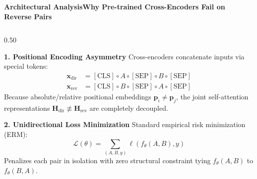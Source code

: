 \documentclass[aspectratio=169,10pt]{beamer}
\begin{document}
\begin{frame}{\textbf{Architectural Analysis}}{\textbf{Why Pre-trained Cross-Encoders Fail on Reverse Pairs}}
  \begin{columns}[T]
    \begin{column}{0.50\textwidth}
      \begin{block}{\textbf{1. Positional Encoding Asymmetry}}
        \footnotesize
        Cross-encoders concatenate inputs via special tokens:
        \vspace{-3pt}
        \[\begin{aligned}
          \mathbf{x}_{\text{dir}} &= [\text{CLS}] \circ A \circ [\text{SEP}] \circ B \circ [\text{SEP}] \\
          \mathbf{x}_{\text{rev}} &= [\text{CLS}] \circ B \circ [\text{SEP}] \circ A \circ [\text{SEP}]
        \end{aligned}\]
        \vspace{-3pt}
        Because absolute/relative positional embeddings $\mathbf{p}_i \neq \mathbf{p}_j$, the joint self-attention representations $\mathbf{H}_{\text{dir}} \not\equiv \mathbf{H}_{\text{rev}}$ are completely decoupled.
      \end{block}
      \vspace{0.05cm}
      \begin{block}{\textbf{2. Unidirectional Loss Minimization}}
        \footnotesize
        Standard empirical risk minimization (ERM):
        \vspace{-3pt}
        \[ \mathcal{L}(\theta) = \sum_{(A, B, y)} \ell\left(f_\theta(A, B), y\right) \]
        \vspace{-3pt}
        Penalizes each pair in isolation with zero structural constraint tying $f_\theta(A, B)$ to $f_\theta(B, A)$.
      \end{block}
    \end{column}


\end{columns}
\end{frame}
\end{document}

